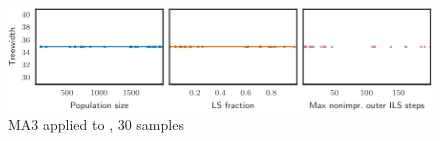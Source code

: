 \begin{figure}[h]\strictpagecheck\centering

\includegraphics[scale=0.85]{plots/MA3-correlation-regplots-myciel6-0-crop.pdf}


\caption[Parameter influence for MA3 when applied to ]{\gls{MA3} applied to , 30 samples}

\label{MA3-correlation-regplots-myciel6}

\end{figure}